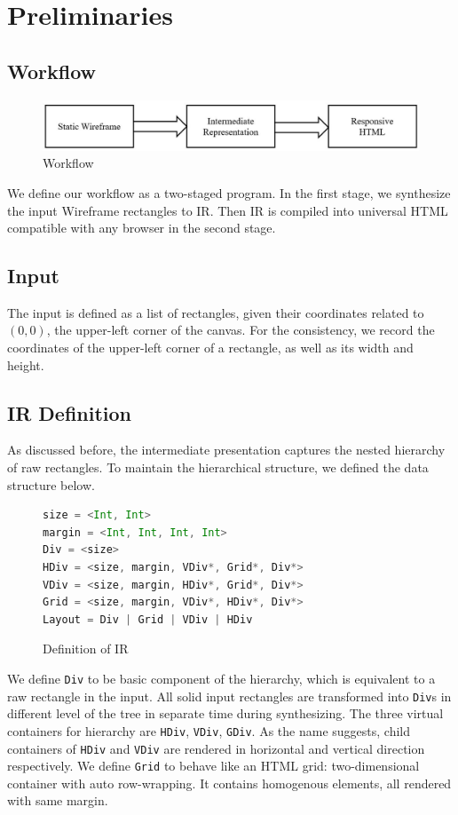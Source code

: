 \documentclass[runningheads]{llncs}
\begin{document}
\section{Preliminaries}
\subsection{Workflow}
\begin{figure}[H]
  \vspace*{-0.1in}
  \includegraphics[width=1\textwidth]{src/workflow.JPG}
  \caption{Workflow}
\end{figure}
We define our workflow as a two-staged program. In the first stage, we synthesize the input Wireframe rectangles to IR. Then IR is compiled into universal HTML compatible with any browser in the second stage. 
\subsection{Input}
The input is defined as a list of rectangles, given their coordinates related to $(0,0)$, the upper-left corner of the canvas. For the consistency, we record the coordinates of the upper-left corner of a rectangle, as well as its width and height.
\subsection{IR Definition}
As discussed before, the intermediate presentation captures the nested hierarchy of raw rectangles. To maintain the hierarchical structure, we defined the data structure below.
\begin{figure}[H]
\vspace*{-0.2in}
\begin{lstlisting}[language=Scala,mathescape=true]
size = <Int, Int>
margin = <Int, Int, Int, Int>
Div = <size>
HDiv = <size, margin, VDiv*, Grid*, Div*>
VDiv = <size, margin, HDiv*, Grid*, Div*>
Grid = <size, margin, VDiv*, HDiv*, Div*>
Layout = Div | Grid | VDiv | HDiv
\end{lstlisting}
\caption{Definition of IR}
\end{figure}
We define \lstinline|Div| to be basic component of the hierarchy, which is equivalent to a raw rectangle in the input. All solid input rectangles are transformed into \lstinline|Div|s in different level of the tree in separate time during synthesizing. The three virtual containers for hierarchy are   \lstinline|HDiv|, \lstinline|VDiv|, \lstinline|GDiv|. As the name suggests, child containers of \lstinline|HDiv| and \lstinline|VDiv| are rendered in horizontal and vertical direction respectively. We define \lstinline|Grid| to behave like an HTML grid: two-dimensional container with auto row-wrapping. It contains homogenous elements, all rendered with same margin.
\end{document}
